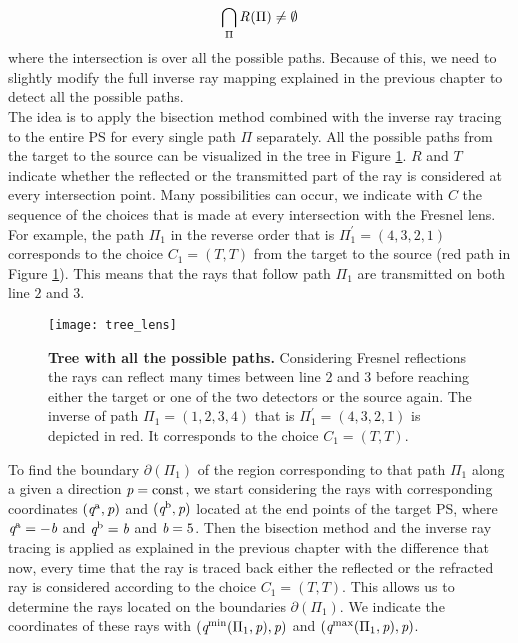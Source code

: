 \begin{equation}
\bigcap_{\Pi}\mbox{$\emph{R}_{\textit{}}$}(\Pi)\neq \emptyset
\end{equation}
where the intersection is over all the possible paths. 
Because of this, we need to slightly modify the full inverse ray mapping explained in the previous chapter to detect all the possible paths. \\ \indent
The idea is to apply the bisection method combined with the inverse ray tracing to the entire PS for every single path $\Pi$ separately. All the possible paths from the target to the source can be visualized in the tree in Figure \ref{fig:tree_fresnel}. $R$ and $T$ indicate whether the reflected or the transmitted part of the ray is considered at every intersection point. Many possibilities can occur, we indicate with $C$ the sequence of the choices that is made at every intersection with the Fresnel lens. For example, the path $\Pi_1$ in the reverse order that is 
$\Pi_1^{\prime}=(4,3,2,1)$ corresponds to the choice $C_1= (T,T)$ from the target to the source (red path in Figure \ref{fig:tree_fresnel}). This means that the rays that follow path $\Pi_1$ are transmitted on both line $2$ and $3$. 
\begin{figure}[t]
  \begin{center}
  \texttt{[image: tree\_lens]}
  \end{center}
  \caption{\textbf{Tree with all the possible paths.} Considering Fresnel reflections the rays can reflect many times between line $2$ and $3$ before reaching either the target or one of the two detectors or the source again. The inverse of path $\Pi_1 = (1,2,3,4)$ that is $\Pi_1^{\prime} = (4,3,2,1)$ is depicted in red. It corresponds to the choice $C_1= (T,T)$.}
\label{fig:tree_fresnel}
 \end{figure}
To find the boundary $\partial$$(\Pi_1)$ of the region corresponding to that path $\Pi_1$ along a given a direction $\textit{p} = \textrm{const}$, we start considering the rays with corresponding coordinates $(\textit{q}^{\textrm{a}}, \textit{p})$ and $(\textit{q}^{\textrm{b}}, \textit{p})$ located at the end points of the target PS, where $\textit{q}^{\textrm{a}} = -\textit{b}$ and $\textit{q}^{\textrm{b}} = \textit{b}$ and $\textit{b}=5$. Then the bisection method and the inverse ray tracing is applied as explained in the previous chapter with the difference that now, every time that the ray is traced back either the reflected or the refracted ray is considered according to the choice $C_1= (T,T)$. This allows us to determine the rays located on the boundaries $\partial$$(\Pi_1)$. We indicate the coordinates of these rays with $(\textit{q}^{\textrm{min}}(\Pi_1, \textit{p}), \textit{p})$ and $(\textit{q}^{\textrm{max}}(\Pi_1, \textit{p}), \textit{p})$. \\ \indent
